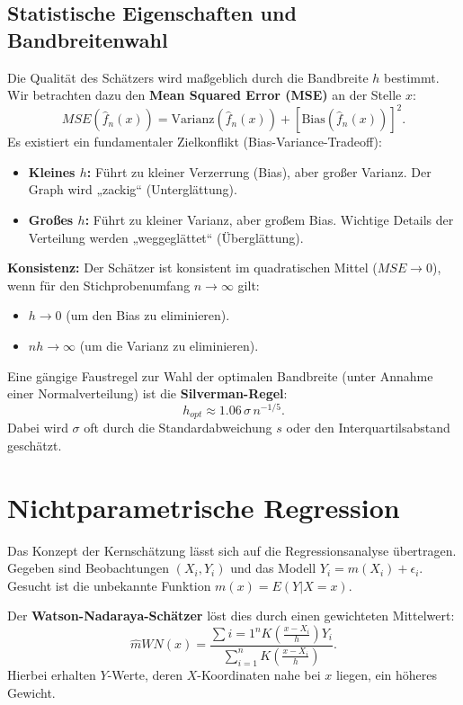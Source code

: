 \documentclass[a4paper,12pt]{article}
\begin{document}
\subsection{Statistische Eigenschaften und Bandbreitenwahl}
Die Qualität des Schätzers wird maßgeblich durch die Bandbreite $h$ bestimmt. Wir betrachten dazu den \textbf{Mean Squared Error (MSE)} an der Stelle $x$:
\begin{equation}
    MSE(\hat{f}_n(x)) = \text{Varianz}(\hat{f}_n(x)) + [\text{Bias}(\hat{f}_n(x))]^2.
\end{equation}
Es existiert ein fundamentaler Zielkonflikt (Bias-Variance-Tradeoff):
\begin{itemize}
    \item \textbf{Kleines $h$:} Führt zu kleiner Verzerrung (Bias), aber großer Varianz. Der Graph wird „zackig“ (Unterglättung).
    \item \textbf{Großes $h$:} Führt zu kleiner Varianz, aber großem Bias. Wichtige Details der Verteilung werden „weggeglättet“ (Überglättung).
\end{itemize}

\textbf{Konsistenz:}
Der Schätzer ist konsistent im quadratischen Mittel ($MSE \to 0$), wenn für den Stichprobenumfang $n \to \infty$ gilt:
\begin{itemize}
    \item $h \to 0$ (um den Bias zu eliminieren).
    \item $nh \to \infty$ (um die Varianz zu eliminieren).
\end{itemize}

Eine gängige Faustregel zur Wahl der optimalen Bandbreite (unter Annahme einer Normalverteilung) ist die \textbf{Silverman-Regel}:
\begin{equation}
    h_{opt} \approx 1.06 \, \sigma \, n^{-1/5}.
\end{equation}
Dabei wird $\sigma$ oft durch die Standardabweichung $s$ oder den Interquartilsabstand geschätzt.

\section{Nichtparametrische Regression}
Das Konzept der Kernschätzung lässt sich auf die Regressionsanalyse übertragen. Gegeben sind Beobachtungen $(X_i, Y_i)$ und das Modell $Y_i = m(X_i) + \epsilon_i$. Gesucht ist die unbekannte Funktion $m(x) = E(Y|X=x)$.

Der \textbf{Watson-Nadaraya-Schätzer} löst dies durch einen gewichteten Mittelwert:
\begin{equation}
    \hat{m}{WN}(x) = \frac{\sum{i=1}^{n} K\left(\frac{x - X_i}{h}\right) Y_i}{\sum_{i=1}^{n} K\left(\frac{x - X_i}{h}\right)}.
\end{equation}
Hierbei erhalten $Y$-Werte, deren $X$-Koordinaten nahe bei $x$ liegen, ein höheres Gewicht.
\end{document}
